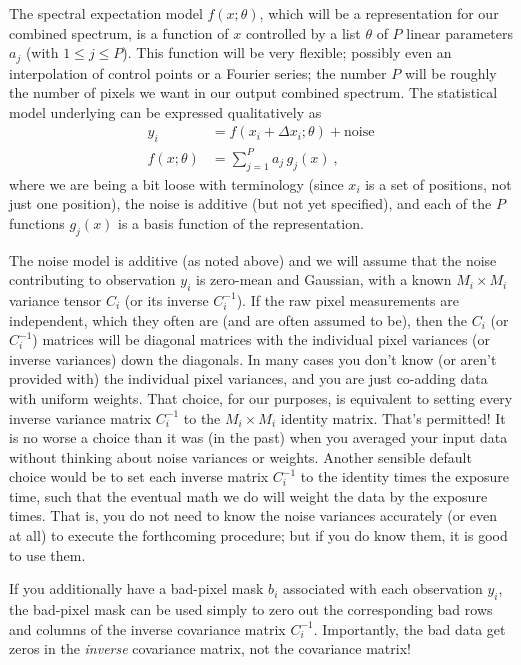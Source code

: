 \documentclass[11pt]{article}
\begin{document}
The spectral expectation model $f(x;\theta)$, which will be a representation for our combined spectrum, is a function of $x$ controlled by a list $\theta$ of $P$ linear parameters $a_j$ (with $1\leq j\leq P$).
This function will be very flexible; possibly even an interpolation of control points or a Fourier series; the number $P$ will be roughly the number of pixels we want in our output combined spectrum.
The statistical model underlying can be expressed qualitatively as
\begin{align}
    y_i &= f(x_i + \Delta x_i;\theta) + \mbox{noise} \\
    f(x;\theta) &= \sum_{j=1}^P a_j\,g_j(x) ~,
\end{align}
where we are being a bit loose with terminology (since $x_i$ is a set of positions, not just one position), the noise is additive (but not yet specified), and each of the $P$ functions $g_j(x)$ is a basis function of the representation.

The noise model is additive (as noted above) and we will assume that the noise contributing to observation $y_i$ is zero-mean and Gaussian, with a known $M_i\times M_i$ variance tensor $C_i$ (or its inverse $C_i^{-1}$).
If the raw pixel measurements are independent, which they often are (and are often assumed to be), then the $C_i$ (or $C_i^{-1}$) matrices will be diagonal matrices with the individual pixel variances (or inverse variances) down the diagonals.
In many cases you don't know (or aren't provided with) the individual pixel variances, and you are just co-adding data with uniform weights.
That choice, for our purposes, is equivalent to setting every inverse variance matrix $C_i^{-1}$ to the $M_i\times M_i$ identity matrix.
That's permitted!
It is no worse a choice than it was (in the past) when you averaged your input data without thinking about noise variances or weights.
Another sensible default choice would be to set each inverse matrix $C_i^{-1}$ to the identity times the exposure time, such that the eventual math we do will weight the data by the exposure times.
That is, you do not need to know the noise variances accurately (or even at all) to execute the forthcoming procedure; but if you do know them, it is good to use them.

If you additionally have a bad-pixel mask $b_i$ associated with each observation $y_i$, the bad-pixel mask can be used simply to zero out the corresponding bad rows and columns of the inverse covariance matrix $C_i^{-1}$.
Importantly, the bad data get zeros in the \emph{inverse} covariance matrix, not the covariance matrix!
\end{document}
